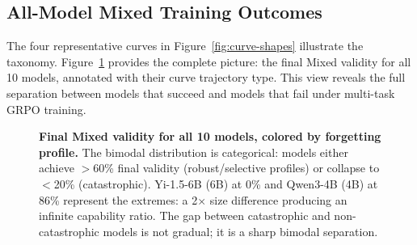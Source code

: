 \documentclass[11pt]{article}
\begin{document}
\subsection{All-Model Mixed Training Outcomes}

The four representative curves in Figure~\ref{fig:curve-shapes} illustrate the taxonomy.  Figure~\ref{fig:all-mixed} provides the complete picture: the final Mixed validity for all 10 models, annotated with their curve trajectory type.  This view reveals the full separation between models that succeed and models that fail under multi-task GRPO training.

\begin{figure}[t]
\centering
{}
\caption{\textbf{Final Mixed validity for all 10 models, colored by forgetting profile.} The bimodal distribution is categorical: models either achieve $>$60\% final validity (robust/selective profiles) or collapse to $<$20\% (catastrophic).  Yi-1.5-6B (6B) at 0\% and Qwen3-4B (4B) at 86\% represent the extremes: a 2$\times$ size difference producing an infinite capability ratio.  The gap between catastrophic and non-catastrophic models is not gradual; it is a sharp bimodal separation.}
\label{fig:all-mixed}
\end{figure}
\end{document}
